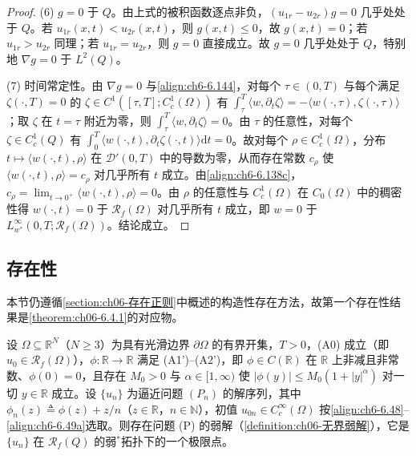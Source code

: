 \documentclass[../../main.tex]{subfiles}%
\begin{document}
\begin{proof}
(6) $g=0$ 于 $Q$。由上式的被积函数逐点非负，$(u_{1r}-u_{2r})g=0$ 几乎处处于 $Q$。若 $u_{1r}(x,t)<u_{2r}(x,t)$，则 $g(x,t)\leqslant0$，故 $g(x,t)=0$；若 $u_{1r}>u_{2r}$ 同理；若 $u_{1r}=u_{2r}$，则 $g=0$ 直接成立。故 $g=0$ 几乎处处于 $Q$，特别地 $\nabla g=0$ 于 $L^2(Q)$。

(7) 时间常定性。由 $\nabla g=0$ 与\eqref{align:ch6-6.144}，对每个 $\tau\in(0,T)$ 与每个满足 $\zeta(\cdot,T)=0$ 的 $\zeta\in C^1([\tau,T];C^1_c(\Omega))$ 有 $\int_\tau^T\langle w,\partial_t\zeta\rangle=-\langle w(\cdot,\tau),\zeta(\cdot,\tau)\rangle$；取 $\zeta$ 在 $t=\tau$ 附近为零，则 $\int_\tau^T\langle w,\partial_t\zeta\rangle=0$。由 $\tau$ 的任意性，对每个 $\zeta\in C^1_c(Q)$ 有 $\int_0^T\langle w(\cdot,t),\partial_t\zeta(\cdot,t)\rangle\mathrm{d}t=0$。故对每个 $\rho\in C^1_c(\Omega)$，分布 $t\mapsto\langle w(\cdot,t),\rho\rangle$ 在 $\mathscr{D}'(0,T)$ 中的导数为零，从而存在常数 $c_\rho$ 使 $\langle w(\cdot,t),\rho\rangle=c_\rho$ 对几乎所有 $t$ 成立。由\eqref{align:ch6-6.138c}，$c_\rho=\lim_{t\to0^+}\langle w(\cdot,t),\rho\rangle=0$。由 $\rho$ 的任意性与 $C^1_c(\Omega)$ 在 $C_0(\Omega)$ 中的稠密性得 $w(\cdot,t)=0$ 于 $\mathscr{R}_f(\Omega)$ 对几乎所有 $t$ 成立，即 $w=0$ 于 $L^\infty_{w^*}(0,T;\mathscr{R}_f(\Omega))$。结论成立。
\end{proof}

\subsection{存在性}\label{subsection:ch06-无界存在}

本节仍遵循\cref{section:ch06-存在正则}中概述的构造性存在方法，故第一个存在性结果是\cref{theorem:ch06-6.4.1}的对应物。

\begin{theorem}\label{theorem:ch06-6.7.3}
设 $\Omega\subseteq\mathbb{R}^N$（$N\geqslant3$）为具有光滑边界 $\partial\Omega$ 的有界开集，$T>0$，(A0) 成立（即 $u_0\in\mathscr{R}_f(\Omega)$），$\phi:\mathbb{R}\to\mathbb{R}$ 满足 (A1')--(A2')，即 $\phi\in C(\mathbb{R})$ 在 $\mathbb{R}$ 上非减且非常数、$\phi(0)=0$，且存在 $M_0>0$ 与 $\alpha\in[1,\infty)$ 使 $|\phi(y)|\leqslant M_0(1+|y|^{\alpha})$ 对一切 $y\in\mathbb{R}$ 成立。设 $\{u_n\}$ 为逼近问题 $(P_n)$ 的解序列，其中 $\phi_n(z)\triangleq\phi(z)+z/n$（$z\in\mathbb{R}$，$n\in\mathbb{N}$），初值 $u_{0n}\in C^\infty_c(\Omega)$ 按\eqref{align:ch6-6.48}--\eqref{align:ch6-6.49a}选取。则存在问题 (P) 的弱解（\cref{definition:ch06-无界弱解}），它是 $\{u_n\}$ 在 $\mathscr{R}_f(Q)$ 的弱$^*$拓扑下的一个极限点。
\end{theorem}
\end{document}

